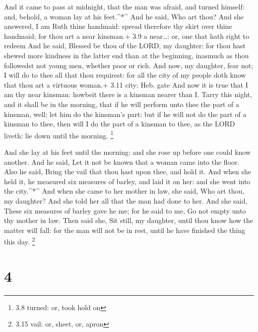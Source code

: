  And it came to pass at midnight, that the man was afraid,
and turned himself: and, behold, a woman lay at his feet.\^{}*\^{}
 And he said, Who art thou? And she answered, I am Ruth
thine handmaid: spread therefore thy skirt over thine handmaid; for thou
art a near kinsman.+ 3.9 a near\ldots: or, one that hath right to redeem
 And he said, Blessed be thou of the LORD, my daughter: for
thou hast shewed more kindness in the latter end than at the beginning,
inasmuch as thou followedst not young men, whether poor or rich.
 And now, my daughter, fear not; I will do to thee all that
thou requirest: for all the city of my people doth know that thou art a
virtuous woman.+ 3.11 city: Heb. gate  And now it is true
that I am thy near kinsman: howbeit there is a kinsman nearer than I.
 Tarry this night, and it shall be in the morning, that if
he will perform unto thee the part of a kinsman, well; let him do the
kinsman's part: but if he will not do the part of a kinsman to thee,
then will I do the part of a kinsman to thee, as the LORD liveth: lie
down until the morning. \footnote{3.8 turned: or, took hold on}

 And she lay at his feet until the morning: and she rose up
before one could know another. And he said, Let it not be known that a
woman came into the floor.  Also he said, Bring the vail
that thou hast upon thee, and hold it. And when she held it, he measured
six measures of barley, and laid it on her: and she went into the
city.\^{}*\^{}  And when she came to her mother in law, she
said, Who art thou, my daughter? And she told her all that the man had
done to her.  And she said, These six measures of barley
gave he me; for he said to me, Go not empty unto thy mother in law.
 Then said she, Sit still, my daughter, until thou know how
the matter will fall: for the man will not be in rest, until he have
finished the thing this day. \footnote{3.15 vail: or, sheet, or, apron}

\hypertarget{section-3}{%
\section{4}\label{section-3}}

